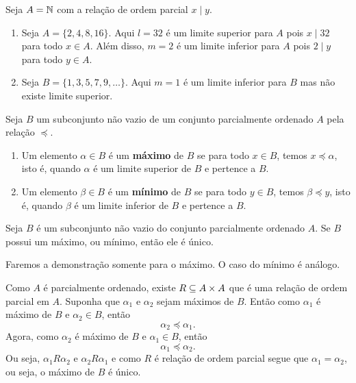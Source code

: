 \begin{exemplo}
	Seja $A = \mathbb{N}$ com a relação de ordem parcial $x \mid y$.
	\begin{enumerate}[label={\arabic*})]
		\item Seja $A = \{2,4,8,16\}$. Aqui $l = 32$ é um limite superior para $A$ pois $x\mid 32$ para todo $x \in A$. Além disso, $m = 2$ é um limite inferior para $A$ pois $2 \mid y$ para todo $y \in A$.
		\item Seja $B = \{1,3,5,7,9,\dots\}$. Aqui $m = 1$ é um limite inferior para $B$ mas não existe limite superior.
	\end{enumerate}
\end{exemplo}

\begin{definicoes}
	Seja $B$ um subconjunto não vazio de um conjunto parcialmente ordenado $A$ pela relação $\preceq$.
	\begin{enumerate}[label={\roman*})]
		\item Um elemento $\alpha \in B$ é um \textbf{máximo} de $B$ se para todo $x \in B$, temos $x \preceq \alpha$, isto é, quando $\alpha$ é um limite superior de $B$ e pertence a $B$.
		\item Um elemento $\beta \in B$ é um \textbf{mínimo} de $B$ se para todo $y \in B$, temos $\beta \preceq y$, isto é, quando $\beta$ é um limite inferior de $B$ e pertence a $B$.
	\end{enumerate}
\end{definicoes}

\begin{proposicao}
	Seja $B$ é um subconjunto não vazio do conjunto parcialmente ordenado $A$. Se $B$ possui um máximo, ou mínimo, então ele é único.
\end{proposicao}
\begin{prova}
	Faremos a demonstração somente para o máximo. O caso do mínimo é análogo.

	Como $A$ é parcialmente ordenado, existe $R \subseteq A \times A$ que é uma relação de ordem parcial em $A$.
	Suponha que $\alpha_1$ e $\alpha_2$ sejam máximos de $B$. Então como $\alpha_1$ é máximo de $B$ e $\alpha_2 \in B$, então
	\[
		\alpha_2 \preceq \alpha_1.
	\]
	Agora, como $\alpha_2$ é máximo de $B$ e $\alpha_1 \in B$, então
	\[
		\alpha_1 \preceq \alpha_2.
	\]
	Ou seja, $\alpha_1 R \alpha_2$ e $\alpha_2R\alpha_1$ e como $R$ é relação de ordem parcial segue que $\alpha_1 = \alpha_2$, ou seja, o máximo de $B$ é único.
\end{prova}

